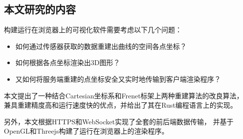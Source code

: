 \subsection{本文研究的内容}

构建运行在浏览器上的可视化软件需要考虑以下几个问题：

\begin{itemize}
\item 如何通过传感器获取的数据重建出曲线的空间各点坐标？
\item 如何根据各点坐标渲染出3D图形？
\item 又如何将服务端重建的点坐标安全又实时地传输到客户端渲染程序？
\end{itemize}

本文提出了一种结合Cartesian坐标系和Frenet标架上两种重建算法的改良算法，
兼具重建精度高和运行速度快的优点，并给出了其在Rust编程语言上的实现。

另外，本文根据HTTPS和WebSocket实现了全套的前后端数据传输，
并基于OpenGL和Threejs构建了运行在浏览器上的渲染程序。